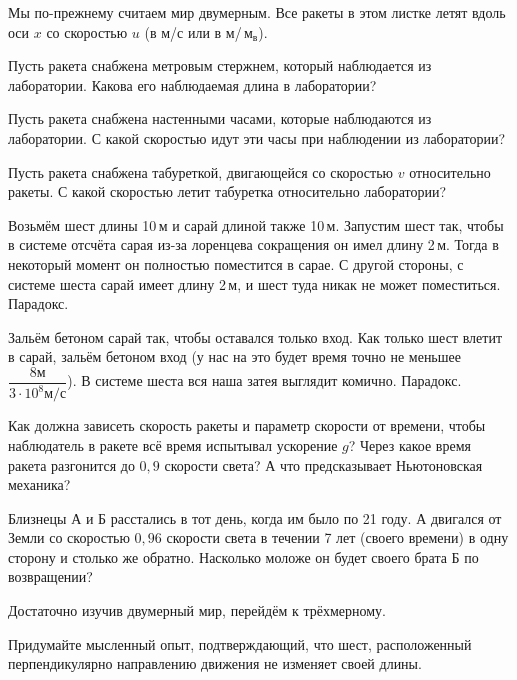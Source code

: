 \documentclass[a4paper,12pt]{article}
\newcommand{\мв}{\,м$_в$}
\begin{document}

{\small Мы по-прежнему считаем мир двумерным. Все ракеты в этом листке летят вдоль оси $x$ со скоростью $u$ (в м/с или в м/\мв).

}


\qquad
Пусть ракета снабжена метровым стержнем, который наблюдается из лаборатории.
Какова его наблюдаемая длина в лаборатории?

\qquad
Пусть ракета снабжена настенными часами, которые наблюдаются из лаборатории.
С какой скоростью идут эти часы при наблюдении из лаборатории?

\qquad
Пусть ракета снабжена табуреткой, двигающейся со скоростью $v$ относительно ракеты. С какой скоростью летит табуретка относительно лаборатории?

\qquad
Возьмём шест длины 10\,м и сарай длиной также 10\,м. Запустим шест так, чтобы в системе отсчёта сарая из-за лоренцева сокращения он имел длину 2\,м. Тогда в некоторый момент он полностью поместится в сарае. С другой стороны, с системе шеста сарай имеет длину 2\,м, и шест туда никак не может поместиться. Парадокс.


\qquad
Зальём бетоном сарай так, чтобы оставался только вход. Как только шест влетит в сарай, зальём бетоном вход (у нас на это будет время точно не меньшее $\dfrac{8м}{3\cdot10^8 м/с}$). В системе шеста вся наша затея выглядит комично. Парадокс.



\qquad
Как должна зависеть скорость ракеты и параметр скорости от времени, чтобы наблюдатель в ракете всё время испытывал ускорение $g$? Через какое время ракета разгонится до $0{,}9$ скорости света? А что предсказывает Ньютоновская механика?

\qquad
Близнецы А и Б расстались в тот день, когда им было по 21 году. А двигался от Земли со скоростью $0{,}96$ скорости света в течении 7 лет (своего времени) в одну сторону и столько же обратно. Насколько моложе он будет своего брата Б по возвращении?



Достаточно изучив двумерный мир, перейдём к трёхмерному.

\qquad
Придумайте мысленный опыт, подтверждающий, что шест, расположенный перпендикулярно направлению движения не изменяет своей длины.
\end{document}
